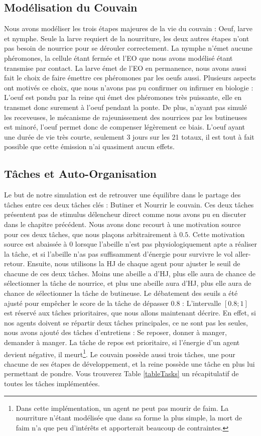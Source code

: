 		
		\subsection{Modélisation du Couvain}
		
			Nous avons modéliser les trois étapes majeures de la vie du couvain : Oeuf, larve et nymphe. Seule la larve requiert de la nourriture, les deux autres étapes n'ont pas besoin de nourrice pour se dérouler correctement. La nymphe n'émet aucune phéromones, la cellule étant fermée et l'EO que nous avons modélisé étant transmise par contact. La larve émet de l'EO en permanence, nous avons aussi fait le choix de faire émettre ces phéromones par les oeufs aussi. Plusieurs aspects ont motivés ce choix, que nous n'avons pas pu confirmer ou infirmer en biologie : L'oeuf est pondu par la reine qui émet des phéromones très puissante, elle en transmet donc surement à l'oeuf pendant la ponte. De plus, n'ayant pas simulé les receveuses, le mécanisme de rajeunissement des nourrices par les butineuses est minoré, l'oeuf permet donc de compenser légèrement ce biais. L'oeuf ayant une durée de vie très courte, seulement 3 jours sur les 21 totaux, il est tout à fait possible que cette émission n'ai quasiment aucun effets.
		
	\subsection{Tâches et Auto-Organisation}
		Le but de notre simulation est de retrouver une équilibre dans le partage des tâches entre ces deux tâches clés : Butiner et Nourrir le couvain. Ces deux tâches présentent pas de stimulus délencheur direct comme nous avons pu en discuter dans le chapitre précédent. Nous avons donc recourt à une motivation source pour ces deux tâches, que nous plaçons arbitrairement à $0.5$. Cette motivation source est abaissée à 0 lorsque l'abeille n'est pas physiologiquement apte a réaliser la tâche, et si l'abeille n'as pas suffisamment d'énergie pour survivre le vol aller-retour. Ensuite, nous utilisons la HJ de chaque agent pour ajuster le seuil de chacune de ces deux tâches. Moins une abeille a d'HJ, plus elle aura de chance de sélectionner la tâche de nourrice, et plus une abeille aura d'HJ, plus elle aura de chance de sélectionner la tâche de butineuse. Le débatement des seuils a été ajusté pour empêcher le score de la tâche de dépasser $0.8$ : L'intervalle $[0.8 ; 1]$ est réservé aux tâches prioritaires, que nous allons maintenant décrire. En effet, si nos agents doivent se répartir deux tâches principales, ce ne sont pas les seules, nous avons ajouté des tâches d'entretiens : Se reposer, donner à manger, demander à manger. La tâche de repos est prioritaire, si l'énergie d'un agent devient négative, il meurt\footnote{Dans cette implémentation, un agent ne peut pas mourir de faim. La nourriture n'étant modélisée que dans sa forme la plus simple, la mort de faim n'a que peu d'intérêts et apporterait beaucoup de contraintes.}. Le couvain possède aussi trois tâches, une pour chacune de ses étapes de développement, et la reine possède une tâche en plus lui permettant de pondre. Vous trouverez Table \ref{tableTasks} un récapitulatif de toutes les tâches implémentées.
		
